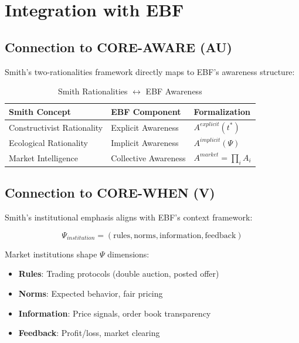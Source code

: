 \section{Integration with EBF}
\label{sec:vs-integration}

\subsection{Connection to CORE-AWARE (AU)}

Smith's two-rationalities framework directly maps to EBF's awareness structure:

\begin{table}[htbp]
\centering
\caption{Smith Rationalities $\leftrightarrow$ EBF Awareness}
\label{tab:vs-aware}
\renewcommand{\arraystretch}{1.3}
\begin{tabular}{@{}lll@{}}
\toprule
\textbf{Smith Concept} & \textbf{EBF Component} & \textbf{Formalization} \\
\midrule
Constructivist Rationality & Explicit Awareness & $A^{explicit}(t^*)$ \\
Ecological Rationality & Implicit Awareness & $A^{implicit}(\Psi)$ \\
Market Intelligence & Collective Awareness & $A^{market} = \prod_i A_i$ \\
\bottomrule
\end{tabular}
\end{table}

\subsection{Connection to CORE-WHEN (V)}

Smith's institutional emphasis aligns with EBF's context framework:

\begin{equation}
\Psi_{institution} = (\text{rules}, \text{norms}, \text{information}, \text{feedback})
\label{eq:vs-psi}
\end{equation}

Market institutions shape $\Psi$ dimensions:
\begin{itemize}
\item \textbf{Rules}: Trading protocols (double auction, posted offer)
\item \textbf{Norms}: Expected behavior, fair pricing
\item \textbf{Information}: Price signals, order book transparency
\item \textbf{Feedback}: Profit/loss, market clearing
\end{itemize}

